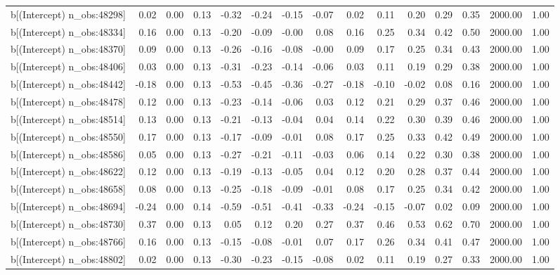 \begin{table}[ht]
\begin{tabular}{rrrrrrrrrrrrrrr}
  b[(Intercept) n\_obs:48298] & 0.02 & 0.00 & 0.13 & -0.32 & -0.24 & -0.15 & -0.07 & 0.02 & 0.11 & 0.20 & 0.29 & 0.35 & 2000.00 & 1.00 \\ 
  b[(Intercept) n\_obs:48334] & 0.16 & 0.00 & 0.13 & -0.20 & -0.09 & -0.00 & 0.08 & 0.16 & 0.25 & 0.34 & 0.42 & 0.50 & 2000.00 & 1.00 \\ 
  b[(Intercept) n\_obs:48370] & 0.09 & 0.00 & 0.13 & -0.26 & -0.16 & -0.08 & -0.00 & 0.09 & 0.17 & 0.25 & 0.34 & 0.43 & 2000.00 & 1.00 \\ 
  b[(Intercept) n\_obs:48406] & 0.03 & 0.00 & 0.13 & -0.31 & -0.23 & -0.14 & -0.06 & 0.03 & 0.11 & 0.19 & 0.29 & 0.38 & 2000.00 & 1.00 \\ 
  b[(Intercept) n\_obs:48442] & -0.18 & 0.00 & 0.13 & -0.53 & -0.45 & -0.36 & -0.27 & -0.18 & -0.10 & -0.02 & 0.08 & 0.16 & 2000.00 & 1.00 \\ 
  b[(Intercept) n\_obs:48478] & 0.12 & 0.00 & 0.13 & -0.23 & -0.14 & -0.06 & 0.03 & 0.12 & 0.21 & 0.29 & 0.37 & 0.46 & 2000.00 & 1.00 \\ 
  b[(Intercept) n\_obs:48514] & 0.13 & 0.00 & 0.13 & -0.21 & -0.13 & -0.04 & 0.04 & 0.14 & 0.22 & 0.30 & 0.39 & 0.46 & 2000.00 & 1.00 \\ 
  b[(Intercept) n\_obs:48550] & 0.17 & 0.00 & 0.13 & -0.17 & -0.09 & -0.01 & 0.08 & 0.17 & 0.25 & 0.33 & 0.42 & 0.49 & 2000.00 & 1.00 \\ 
  b[(Intercept) n\_obs:48586] & 0.05 & 0.00 & 0.13 & -0.27 & -0.21 & -0.11 & -0.03 & 0.06 & 0.14 & 0.22 & 0.30 & 0.38 & 2000.00 & 1.00 \\ 
  b[(Intercept) n\_obs:48622] & 0.12 & 0.00 & 0.13 & -0.19 & -0.13 & -0.05 & 0.04 & 0.12 & 0.20 & 0.28 & 0.37 & 0.44 & 2000.00 & 1.00 \\ 
  b[(Intercept) n\_obs:48658] & 0.08 & 0.00 & 0.13 & -0.25 & -0.18 & -0.09 & -0.01 & 0.08 & 0.17 & 0.25 & 0.34 & 0.42 & 2000.00 & 1.00 \\ 
  b[(Intercept) n\_obs:48694] & -0.24 & 0.00 & 0.14 & -0.59 & -0.51 & -0.41 & -0.33 & -0.24 & -0.15 & -0.07 & 0.02 & 0.09 & 2000.00 & 1.00 \\ 
  b[(Intercept) n\_obs:48730] & 0.37 & 0.00 & 0.13 & 0.05 & 0.12 & 0.20 & 0.27 & 0.37 & 0.46 & 0.53 & 0.62 & 0.70 & 2000.00 & 1.00 \\ 
  b[(Intercept) n\_obs:48766] & 0.16 & 0.00 & 0.13 & -0.15 & -0.08 & -0.01 & 0.07 & 0.17 & 0.26 & 0.34 & 0.41 & 0.47 & 2000.00 & 1.00 \\ 
  b[(Intercept) n\_obs:48802] & 0.02 & 0.00 & 0.13 & -0.30 & -0.23 & -0.15 & -0.08 & 0.02 & 0.11 & 0.19 & 0.27 & 0.33 & 2000.00 & 1.00 \\ 

\end{tabular}
\end{table}
